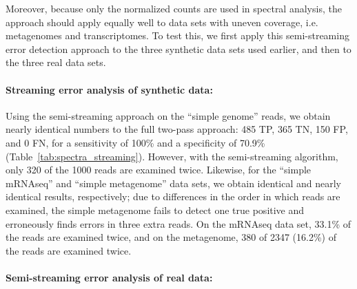 \documentclass{article}
\begin{document}
Moreover, because only the normalized counts are used in spectral
analysis, the approach should apply equally well to data sets with
uneven coverage, i.e. metagenomes and transcriptomes.  To test this,
we first apply this semi-streaming error detection approach to the three
synthetic data sets used earlier, and then to the three real data
sets.

\paragraph{Streaming error analysis of synthetic data:}

Using the semi-streaming approach on the ``simple genome'' reads, we obtain
nearly identical numbers to the full two-pass approach: 485 TP, 365
TN, 150 FP, and 0 FN, for a sensitivity of 100\% and a specificity of
70.9\% (Table~\ref{tab:spectra_streaming}).  However, with the
semi-streaming algorithm, only 320 of the 1000 reads are examined twice.
Likewise, for the ``simple mRNAseq'' and ``simple metagenome'' data
sets, we obtain identical and nearly identical results, respectively;
due to differences in the order in which reads are examined, the
simple metagenome fails to detect one true positive and erroneously
finds errors in three extra reads.  On the mRNAseq data set, 33.1\% of
the reads are examined twice, and on the metagenome, 380 of 2347
(16.2\%) of the reads are examined twice.

\paragraph{Semi-streaming error analysis of real data:}



\end{document}
